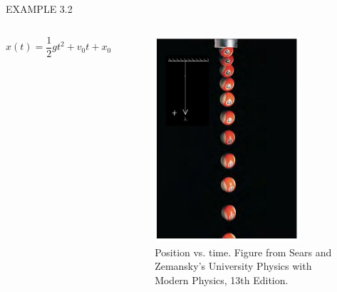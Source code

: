 \documentclass[]{beamer}
\begin{document}
\begin{frame}
    EXAMPLE 3.2
    
    \vspace{3mm}
    
     \begin{columns}[c]
        \column{2in}  %
       
        \begin{equation}
           x(t)=\frac{1}{2}gt^ 2+v_0t+x_0
            \end{equation}
     
     
        \column{2.5in}
        
        \begin{figure}[h!]  
       \includegraphics[width=0.8\textwidth]{images/2.jpg}
        \caption{Position vs. time. {\tiny Figure from Sears and Zemansky's University Physics 
        with Modern Physics, 13th Edition.} }
     \end{figure}
     
     
     
        \end{columns}
     
    \end{frame}
\end{document}
